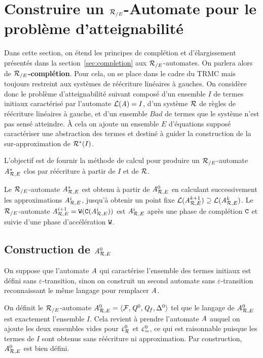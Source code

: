 

\section{Construire un ${\mathcal R_{/E}}$-Automate pour le problème d'atteignabilité}


Dans cette section, on étend les principes de complétion et d'élargissement
présentés dans la section~\ref{sec:completion} aux ${\mathcal R_{/E}}$-automates.
On parlera alors de \textbf{${\mathcal R_{/E}}$-complétion}. Pour cela, on se place dans le cadre
du TRMC mais toujours restreint aux systèmes de réécriture linéaires à gauches.
On considère donc le problème d'atteignabilité suivant composé d'un ensemble
$I$ de termes initiaux caractérisé par l'automate $\mathcal{L}(\mathit A) = I$, 
d'un système $\mathcal R$ de règles de réécriture linéaires à gauche, et d'un ensemble
$Bad$ de termes que le système n'est pas sensé atteindre.
À cela on ajoute un ensemble $E$ d'équations supposé caractériser une 
abstraction des termes et destiné à guider la construction de la sur-approximation 
de $\mathcal R^*(I)$.

L'objectif est de fournir la méthode de calcul pour produire un ${\mathcal R_{/E}}$-automate $\mathit A^*_{\mathcal R,E}$ 
clos par réécriture à partir de $I$ et de $\mathcal R$.

Le ${\mathcal R_{/E}}$-automate $\mathit A^*_{\mathcal R,E}$ est obtenu à partir de ${\mathit A}_{\mathcal R,E}^0$ en calculant
successivement les approximations ${\mathit A}_{\mathcal R,E}^i$, jusqu'à obtenir un point fixe
$\mathcal{L}({\mathit A}_{\mathcal R,E}^{k+1}) \supseteq \mathcal{L}({\mathit A}_{\mathcal R,E}^{k})$. Le ${\mathcal R_{/E}}$-automate ${\mathit A}_{\mathcal R,E}^{i+1}=\mathtt{W}(\mathtt{C}({\mathit A}_{\mathcal R,E}^i))$
est ${\mathit A}_{\mathcal R,E}^i$ après une phase de complétion $\mathtt{C}$ et suivie d'une phase d'accélération $\mathtt{W}$.


\subsection{Construction de ${\mathit A}_{\mathcal R,E}^0$}


On suppose que l'automate $\mathit A$ qui caractérise l'ensemble des termes initiaux 
est défini sans $\varepsilon$-transition, sinon on construit un second automate 
sans $\varepsilon$-transition reconnaissant le même langage pour remplacer $\mathit A$.

On définit le ${\mathcal R_{/E}}$-automate ${\mathit A}_{\mathcal R,E}^0 = \langle \mathcal{F}, \mathit Q^0, \mathit Q_f, \Delta^0\rangle$ tel que
le langage de ${\mathit A}_{\mathcal R,E}^0$ est exactement l'ensemble $I$. Cela revient à prendre 
l'automate $\mathit A$ auquel on ajoute les deux ensembles vides pour $\upvarepsilon_{\mathcal R}^0$ et $\upvarepsilon_{=}^0$, ce qui
est raisonnable puisque les termes de $I$ sont obtenus sans réécriture ni approximation.
Par construction, ${\mathit A}_{\mathcal R,E}^0$ est bien défini.

